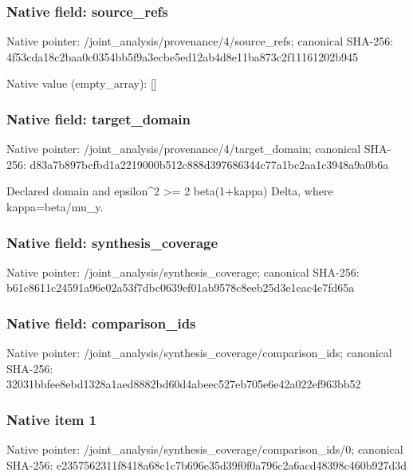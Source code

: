 \documentclass[10pt,a4paper]{article}
\begin{document}
\subsubsection{Native field: source\_\allowbreak{}refs}
Native pointer: /joint\_\allowbreak{}analysis/provenance/4/source\_\allowbreak{}refs; canonical SHA-256: 4f53cda18c2baa0c0354bb5f9a3ecbe5ed12ab4d8e11ba873c2f11161202b945

Native value (empty\_\allowbreak{}array): []

\subsubsection{Native field: target\_\allowbreak{}domain}
Native pointer: /joint\_\allowbreak{}analysis/provenance/4/target\_\allowbreak{}domain; canonical SHA-256: d83a7b897bcfbd1a2219000b512c888d397686344c77a1bc2aa1c3948a9a0b6a

\begingroup\raggedright\sloppy Declared domain and epsilon\textasciicircum{}2 >=\allowbreak{} 2 beta(1+kappa) Delta,\allowbreak{} where kappa=\allowbreak{}beta/\allowbreak{}mu\_\allowbreak{}y.\par\endgroup

\subsubsection{Native field: synthesis\_\allowbreak{}coverage}
Native pointer: /joint\_\allowbreak{}analysis/synthesis\_\allowbreak{}coverage; canonical SHA-256: b61c8611c24591a96e02a53f7dbc0639ef01ab9578c8eeb25d3e1eac4e7fd65a

\subsubsection{Native field: comparison\_\allowbreak{}ids}
Native pointer: /joint\_\allowbreak{}analysis/synthesis\_\allowbreak{}coverage/comparison\_\allowbreak{}ids; canonical SHA-256: 32031bbfee8ebd1328a1aed8882bd60d4abeec527eb705e6e42a022ef963bb52

\subsubsection{Native item 1}
Native pointer: /joint\_\allowbreak{}analysis/synthesis\_\allowbreak{}coverage/comparison\_\allowbreak{}ids/0; canonical SHA-256: e2357562311f8418a68c1c7b696e35d39f0f0a796c2a6acd48398c460b927d3d
\end{document}
